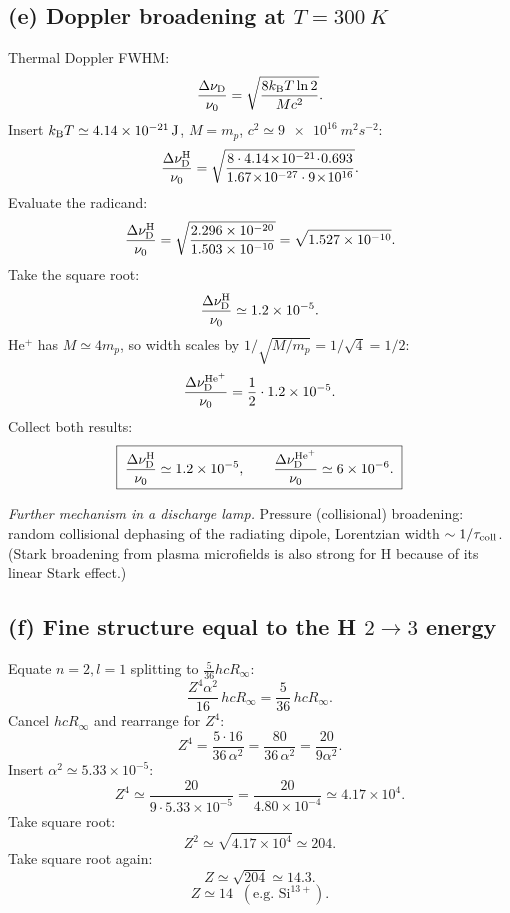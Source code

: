 \documentclass[11pt]{article}
\begin{document}
\subsection*{(e) Doppler broadening at $T=\SI{300}{K}$}

Thermal Doppler FWHM:
\[
\frac{\Delta\nu_{\rm D}}{\nu_0}=\sqrt{\frac{8 k_{\rm B} T \ln 2}{M c^{2}}}.
\]
Insert $k_{\rm B}T\simeq\SI{4.14e-21}{J}$, $M=m_p$, $c^2\simeq\SI{9e16}{m^2 s^{-2}}$:
\[
\frac{\Delta\nu_{\rm D}^{\rm H}}{\nu_0}=\sqrt{\frac{8\cdot 4.14\!\times\!10^{-21}\!\cdot\!0.693}{1.67\!\times\!10^{-27}\cdot 9\!\times\!10^{16}}}.
\]
Evaluate the radicand:
\[
\frac{\Delta\nu_{\rm D}^{\rm H}}{\nu_0}=\sqrt{\frac{2.296\times 10^{-20}}{1.503\times 10^{-10}}}=\sqrt{1.527\times 10^{-10}}.
\]
Take the square root:
\[
\frac{\Delta\nu_{\rm D}^{\rm H}}{\nu_0}\simeq 1.2\times 10^{-5}.
\]
He$^+$ has $M\simeq 4 m_p$, so width scales by $1/\sqrt{M/m_p}=1/\sqrt{4}=1/2$:
\[
\frac{\Delta\nu_{\rm D}^{\rm He^+}}{\nu_0}=\frac{1}{2}\cdot 1.2\times 10^{-5}.
\]
Collect both results:
\begin{equation}
\boxed{\;\frac{\Delta\nu_{\rm D}^{\rm H}}{\nu_0}\simeq 1.2\times 10^{-5},\qquad
\frac{\Delta\nu_{\rm D}^{\rm He^+}}{\nu_0}\simeq 6\times 10^{-6}.\;}
\label{eq:doppRes}
\end{equation}

\textit{Further mechanism in a discharge lamp.} Pressure (collisional) broadening: random collisional dephasing of the radiating dipole, Lorentzian width $\sim 1/\tau_{\rm coll}$. (Stark broadening from plasma microfields is also strong for H because of its linear Stark effect.)

\subsection*{(f) Fine structure equal to the H $2\to 3$ energy}

Equate $n=2,l=1$ splitting to $\tfrac{5}{36}hcR_\infty$:
\[
\frac{Z^{4}\alpha^{2}}{16}\,hcR_\infty=\frac{5}{36}\,hcR_\infty.
\]
Cancel $hcR_\infty$ and rearrange for $Z^4$:
\[
Z^{4}=\frac{5\cdot 16}{36\,\alpha^{2}}=\frac{80}{36\,\alpha^{2}}=\frac{20}{9\alpha^{2}}.
\]
Insert $\alpha^{2}\simeq 5.33\times 10^{-5}$:
\[
Z^{4}\simeq\frac{20}{9\cdot 5.33\times 10^{-5}}=\frac{20}{4.80\times 10^{-4}}\simeq 4.17\times 10^{4}.
\]
Take square root:
\[
Z^{2}\simeq\sqrt{4.17\times 10^{4}}\simeq 204.
\]
Take square root again:
\[
Z\simeq\sqrt{204}\simeq 14.3.
\]
\begin{equation}
\boxed{\;Z\simeq 14\;\;(\text{e.g.\ Si}^{13+}).\;}
\label{eq:Z-eq}
\end{equation}
\end{document}
